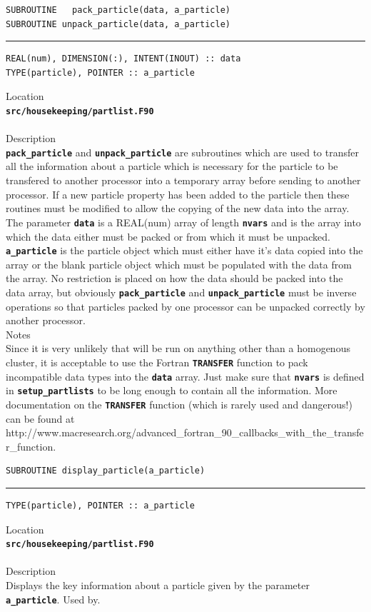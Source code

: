 \documentclass[12pt,a4paper]{article}
\newcommand{\HRule}{\rule{\linewidth}{0.5mm}}
\newcommand{\inlinecode}[1]{{\color{warwickred} \bf\texttt{#1}}}
\newcommand{\EPOCH}{{\color{warwickdark}\fontfamily{phv}\selectfont{EPOCH}}}
\newcommand{\codedef}{\begin{Verbatim}[formatcom=\color{warwickred},fontsize=\Large,hfuzz=0pt]}
\newcommand{\coderule}{
{\color{warwickred}\vspace{-0.5cm}\HRule}
\codedef}
\begin{document}
\pagebreak
\codedef
SUBROUTINE   pack_particle(data, a_particle)
SUBROUTINE unpack_particle(data, a_particle)
\end{Verbatim}
\coderule
REAL(num), DIMENSION(:), INTENT(INOUT) :: data
TYPE(particle), POINTER :: a_particle
\end{Verbatim}
\vspace{1cm}
{\Large Location\\}
\inlinecode{src/housekeeping/partlist.F90}\\
\\[0.5cm]
{\Large Description\\}
\inlinecode{pack\_particle} and \inlinecode{unpack\_particle} are subroutines
which are used to transfer all the information about a particle which is
necessary for the particle to be transfered to another processor into a
temporary array before sending to another processor. If a new particle property
has been added to the particle then these routines must be modified to allow
the copying of the new data into the array. The parameter \inlinecode{data} is
a REAL(num) array of length \inlinecode{nvars} and is the array into which the
data either must be packed or from which it must be
unpacked. \inlinecode{a\_particle} is the particle object which must either have
it's data copied into the array or the blank particle object which must be
populated with the data from the array. No restriction is placed on how the
data should be packed into the data array, but obviously
\inlinecode{pack\_particle} and \inlinecode{unpack\_particle} must be inverse
operations so that particles packed by one processor can be unpacked correctly
by another processor.
\\[0.5cm]
{\Large Notes\\}
Since it is very unlikely that {\EPOCH} will be run on anything other than a
homogenous cluster, it is acceptable to use the Fortran \inlinecode{TRANSFER}
function to pack incompatible data types into the \inlinecode{data} array. Just
make sure that \inlinecode{nvars} is defined in \inlinecode{setup\_partlists}
to be long enough to contain all the information. More documentation on the
\inlinecode{TRANSFER} function (which is rarely used and dangerous!) can be
found at
http://www.macresearch.org/advanced\_fortran\_90\_callbacks\_with\_the\_transfer\_function.

\pagebreak
\codedef
SUBROUTINE display_particle(a_particle)
\end{Verbatim}
\coderule
TYPE(particle), POINTER :: a_particle
\end{Verbatim}
\vspace{1cm}
{\Large Location\\}
\inlinecode{src/housekeeping/partlist.F90}\\
\\[0.5cm]
{\Large Description\\}
Displays the key information about a particle given by the parameter
\inlinecode{a\_particle}. Used by\linebreak \inlinecode{compare\_particles}.
\\[0.5cm]
\end{document}
